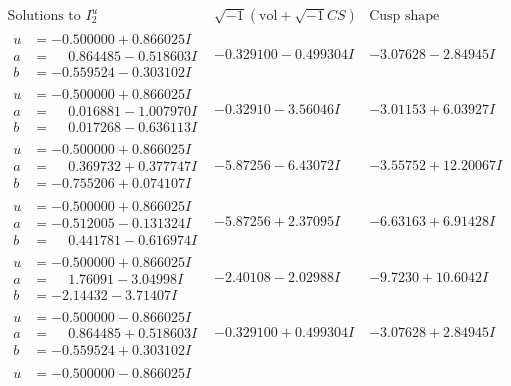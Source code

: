 \documentclass[1p]{elsarticle_modified}
\theoremstyle{definition}
\newcommand{\I}{\sqrt{-1}}
\begin{document}
$$\begin{array}{c|c|c}  
\text{Solutions to }I^u_{2}& \I (\text{vol} + \sqrt{-1}CS) & \text{Cusp shape}\\
 \hline 
\begin{aligned}
u &= -0.500000 + 0.866025 I \\
a &= \phantom{-}0.864485 - 0.518603 I \\
b &= -0.559524 - 0.303102 I\end{aligned}
 & -0.329100 - 0.499304 I & -3.07628 - 2.84945 I \\ \hline\begin{aligned}
u &= -0.500000 + 0.866025 I \\
a &= \phantom{-}0.016881 - 1.007970 I \\
b &= \phantom{-}0.017268 - 0.636113 I\end{aligned}
 & -0.32910 - 3.56046 I & -3.01153 + 6.03927 I \\ \hline\begin{aligned}
u &= -0.500000 + 0.866025 I \\
a &= \phantom{-}0.369732 + 0.377747 I \\
b &= -0.755206 + 0.074107 I\end{aligned}
 & -5.87256 - 6.43072 I & -3.55752 + 12.20067 I \\ \hline\begin{aligned}
u &= -0.500000 + 0.866025 I \\
a &= -0.512005 - 0.131324 I \\
b &= \phantom{-}0.441781 - 0.616974 I\end{aligned}
 & -5.87256 + 2.37095 I & -6.63163 + 6.91428 I \\ \hline\begin{aligned}
u &= -0.500000 + 0.866025 I \\
a &= \phantom{-}1.76091 - 3.04998 I \\
b &= -2.14432 - 3.71407 I\end{aligned}
 & -2.40108 - 2.02988 I & -9.7230 + 10.6042 I \\ \hline\begin{aligned}
u &= -0.500000 - 0.866025 I \\
a &= \phantom{-}0.864485 + 0.518603 I \\
b &= -0.559524 + 0.303102 I\end{aligned}
 & -0.329100 + 0.499304 I & -3.07628 + 2.84945 I \\ \hline\begin{aligned}
u &= -0.500000 - 0.866025 I \\

\end{aligned}
\end{array}$$
\end{document}
